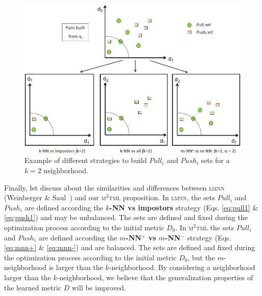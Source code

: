 \begin{figure}[h!]
	\centering
	\includegraphics[width=0.9\linewidth]{images/Strategy_neighborhood}
	\caption{Example of different strategies to build $Pull_i$ and $Push_i$ sets for a $k=2$ neighborhood.}
	\label{fig:Strategy_neighborhood}
\end{figure}

Finally, let discuss about the similarities and differences between \textsc{lmnn} (Weinberger \& Saul~\cite{Weinberger2009}) and our \textsc{m$^2$tml} proposition. In \textsc{lmnn}, the sets $Pull_i$ and $Push_i$ are defined according the \textbf{$k$-NN vs impostors} strategy (Eqs. \ref{eq:pull1} \& \ref{eq:push1}) and may be unbalanced. The sets are defined and fixed during the optimization process according to the initial metric $D_0$. In \textsc{m$^2$tml} the sets $Pull_i$ and $Push_i$ are defined according the \textbf{$m$-NN$^+$ vs $m$-NN$^-$} strategy (Eqs. \ref{eq:mnn+} \& \ref{eq:mnn-}) and are balanced. The sets are defined and fixed during the optimization process according to the initial metric $D_0$, but the $m$-neighborhood is larger than the $k$-neighborhood. By considering a neighborhood larger than the $k$-neighborhood, we believe that the generalization properties of the learned metric $D$ will be improved. 

